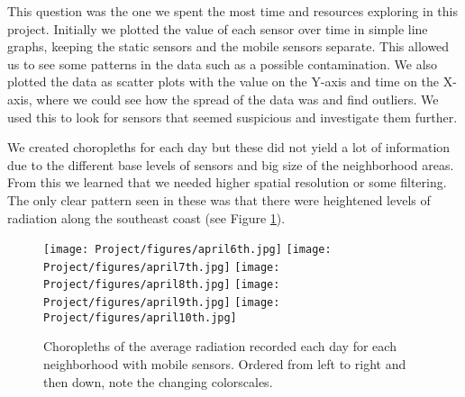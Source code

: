 \documentclass[journal]{vgtc}                %
\begin{document}
This question was the one we spent the most time and resources exploring in this project. Initially we plotted the value of each sensor over time in simple line graphs, keeping the static sensors and the mobile sensors separate. This allowed us to see some patterns in the data such as a possible contamination. We also plotted the data as scatter plots with the value on the Y-axis and time on the X-axis, where we could see how the spread of the data was and find outliers. We used this to look for sensors that seemed suspicious and investigate them further.

We created choropleths for each day but these did not yield a lot of information due to the different base levels of sensors and big size of the neighborhood areas. From this we learned that we needed higher spatial resolution or some filtering. The only clear pattern seen in these was that there were heightened levels of radiation along the southeast coast (see Figure \ref{fig:choropleths}).

\begin{figure}[h!]
    \centering
    \texttt{[image: Project/figures/april6th.jpg]}
    \texttt{[image: Project/figures/april7th.jpg]}
    \texttt{[image: Project/figures/april8th.jpg]}
    \texttt{[image: Project/figures/april9th.jpg]}
    \texttt{[image: Project/figures/april10th.jpg]}
    \caption{Choropleths of the average radiation recorded each day for each neighborhood with mobile sensors. Ordered from left to right and then down, note the changing colorscales.}
      \label{fig:choropleths}
\end{figure}
\end{document}
